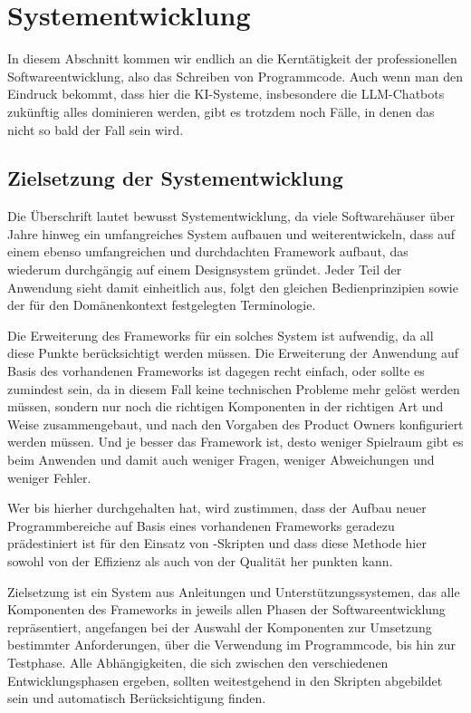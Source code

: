 \chapter{Systementwicklung}
In diesem Abschnitt kommen wir endlich an die Kerntätigkeit der professionellen Softwareentwicklung, also das Schreiben von Programmcode. Auch wenn man den Eindruck bekommt, dass hier die KI-Systeme, insbesondere die LLM-Chatbots zukünftig alles dominieren werden, gibt es trotzdem noch Fälle, in denen das nicht so bald der Fall sein wird.

\section{Zielsetzung der Systementwicklung}
Die Überschrift lautet bewusst Systementwicklung, da viele Softwarehäuser über Jahre hinweg ein umfangreiches System aufbauen und weiterentwickeln, dass auf einem ebenso umfangreichen und durchdachten Framework aufbaut, das wiederum durchgängig auf einem Designsystem gründet. Jeder Teil der Anwendung sieht damit einheitlich aus, folgt den gleichen Bedienprinzipien sowie der für den Domänenkontext festgelegten Terminologie.

Die Erweiterung des Frameworks für ein solches System ist aufwendig, da all diese Punkte berücksichtigt werden müssen. Die Erweiterung der Anwendung auf Basis des vorhandenen Frameworks ist dagegen recht einfach, oder sollte es zumindest sein, da in diesem Fall keine technischen Probleme mehr gelöst werden müssen, sondern nur noch die richtigen Komponenten in der richtigen Art und Weise zusammengebaut, und nach den Vorgaben des Product Owners konfiguriert werden müssen. Und je besser das Framework ist, desto weniger Spielraum gibt es beim Anwenden und damit auch weniger Fragen, weniger Abweichungen und weniger Fehler.

Wer bis hierher durchgehalten hat, wird zustimmen, dass der Aufbau neuer Programmbereiche auf Basis eines vorhandenen Frameworks geradezu prädestiniert ist für den Einsatz von \FPZb-Skripten und dass diese Methode hier sowohl von der Effizienz als auch von der Qualität her punkten kann.

Zielsetzung ist ein System aus Anleitungen und Unterstützungssystemen, das alle Komponenten des Frameworks in jeweils allen Phasen der Softwareentwicklung repräsentiert, angefangen bei der Auswahl der Komponenten zur Umsetzung bestimmter Anforderungen, über die Verwendung im Programmcode, bis hin zur Testphase. Alle Abhängigkeiten, die sich zwischen den verschiedenen Entwicklungsphasen ergeben, sollten weitestgehend in den Skripten abgebildet sein und automatisch Berücksichtigung finden.

